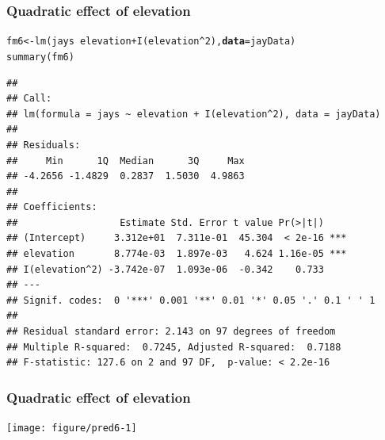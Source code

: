\documentclass[color=usenames,dvipsnames]{beamer}\usepackage[]{graphicx}\usepackage[]{color}
\makeatletter
\newcommand{\hlnum}[1]{\textcolor[rgb]{0.69,0.494,0}{#1}}%
\newcommand{\hlopt}[1]{\textcolor[rgb]{0,0,0}{#1}}%
\newcommand{\hlstd}[1]{\textcolor[rgb]{0,0,0}{#1}}%
\newcommand{\hlkwb}[1]{\textcolor[rgb]{0,0.341,0.682}{#1}}%
\newcommand{\hlkwc}[1]{\textcolor[rgb]{0,0,0}{\textbf{#1}}}%
\newcommand{\hlkwd}[1]{\textcolor[rgb]{0.004,0.004,0.506}{#1}}%
\newenvironment{kframe}{%
 \def\at@end@of@kframe{}%
 \ifinner\ifhmode%
  \def\at@end@of@kframe{\end{minipage}}%
  \begin{minipage}{\columnwidth}%
 \fi\fi%
 \def\FrameCommand##1{\hskip\@totalleftmargin \hskip-\fboxsep
 \colorbox{shadecolor}{##1}\hskip-\fboxsep
     \hskip-\linewidth \hskip-\@totalleftmargin \hskip\columnwidth}%
 \MakeFramed {\advance\hsize-\width
   \@totalleftmargin\z@ \linewidth\hsize
   \@setminipage}}%
 {\par\unskip\endMakeFramed%
 \at@end@of@kframe}
\newenvironment{knitrout}{}{} %
\makeatother
\begin{document}
\begin{frame}[fragile]
  \frametitle{Quadratic effect of elevation}
\begin{knitrout}\scriptsize
{}\color{fgcolor}\begin{kframe}
\begin{alltt}
\hlstd{fm6} \hlkwb{<-} \hlkwd{lm}\hlstd{(jays} \hlopt{~} \hlstd{elevation}\hlopt{+}\hlkwd{I}\hlstd{(elevation}\hlopt{^}\hlnum{2}\hlstd{),} \hlkwc{data}\hlstd{=jayData)}
\hlkwd{summary}\hlstd{(fm6)}
\end{alltt}
\begin{verbatim}
## 
## Call:
## lm(formula = jays ~ elevation + I(elevation^2), data = jayData)
## 
## Residuals:
##     Min      1Q  Median      3Q     Max 
## -4.2656 -1.4829  0.2837  1.5030  4.9863 
## 
## Coefficients:
##                  Estimate Std. Error t value Pr(>|t|)    
## (Intercept)     3.312e+01  7.311e-01  45.304  < 2e-16 ***
## elevation       8.774e-03  1.897e-03   4.624 1.16e-05 ***
## I(elevation^2) -3.742e-07  1.093e-06  -0.342    0.733    
## ---
## Signif. codes:  0 '***' 0.001 '**' 0.01 '*' 0.05 '.' 0.1 ' ' 1
## 
## Residual standard error: 2.143 on 97 degrees of freedom
## Multiple R-squared:  0.7245,	Adjusted R-squared:  0.7188 
## F-statistic: 127.6 on 2 and 97 DF,  p-value: < 2.2e-16
\end{verbatim}
\end{kframe}
\end{knitrout}
\end{frame}




\begin{frame}[fragile]
  \frametitle{Quadratic effect of elevation}
\begin{knitrout}
\color{fgcolor}
\texttt{[image: figure/pred6-1]} 

\end{knitrout}
\end{frame}
\end{document}
